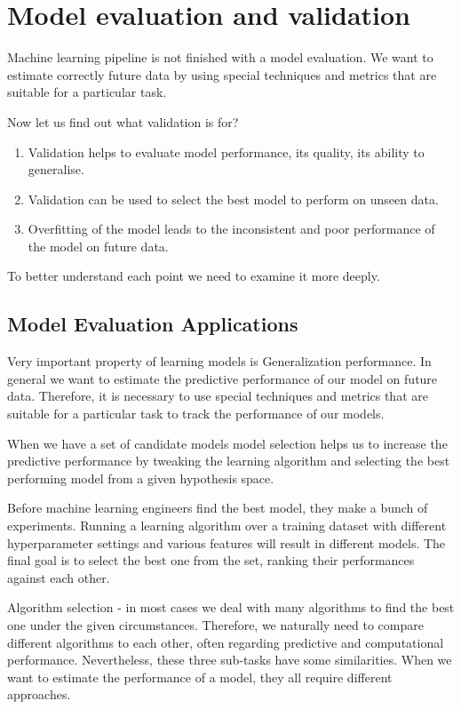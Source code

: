 \section{Model evaluation and validation} \label{sect1_4}
Machine learning pipeline is not finished with a model evaluation. We want to estimate correctly future data by using special techniques and metrics that are suitable for a particular task.

Now let us find out what validation is for?
\begin{enumerate}
	\item Validation helps to evaluate model performance, its quality, its ability to generalise.
	\item Validation can be used to select the best model to perform on unseen data.
	\item Overfitting of the model leads to the inconsistent and poor performance of the model on future data.
\end{enumerate}

To better understand each point we need to examine it more deeply.

\subsection{Model Evaluation Applications}
Very important property of learning models is Generalization performance. In general we want to estimate the predictive performance of our model on future data.  Therefore, it is necessary to use special techniques and metrics that are suitable for a particular task to track the performance of our models. 

When we have a set of candidate models model selection helps us to increase the predictive performance by tweaking the learning algorithm and selecting the best performing model from a given hypothesis space.
 
Before machine learning engineers find the best model, they make a bunch of experiments. Running a learning algorithm over a training dataset with different hyperparameter settings and various features will result in different models. The final goal is to select the best one from the set, ranking their performances against each other.

Algorithm selection - in most cases we deal with many algorithms to find the best one under the given circumstances. Therefore, we naturally need to compare different algorithms to each other, often regarding predictive and computational performance.
Nevertheless, these three sub-tasks have some similarities. When we want to estimate the performance of a model, they all require different approaches.



